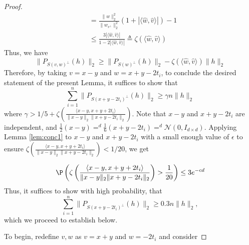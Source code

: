 \begin{proof}
\begin{align*}
& = \frac{\|w\|_2^2}{\|w_{v^\perp}\|_2^2}\left(1 + |\langle \hat{w}, \hat{v} \rangle | \right) - 1\\
& \leq \frac{3 |\langle \hat{w}, \hat{v} \rangle |}{1- 2|\langle \hat{w}, \hat{v} \rangle |} \triangleq \zeta( \langle\hat{w},\hat{v} \rangle )
\end{align*}
Thus, we have
\[
\| P_{S(v,w)^\perp}(h) \|_2 \geq \|P_{S(w)^\perp}(h)\|_2 -  \zeta( \langle \hat{w},\hat{v} \rangle) \|h\|_2
\]
Therefore, by taking $v = x-y$ and $w = x+y -2t_i$, to conclude the desired statement of the present Lemma, it suffices to show that
\[
\sum_{i=1}^n \| P_{S(x+y-2t_i)^\perp}(h)\|_2 \geq \gamma n\|h\|_2
\]
where $\gamma > 1/5 + \zeta \left(\frac{\langle x-y, x+y + 2t_i \rangle}{\|x-y\|_2 \| x+y -2t_i \|_2}\right)$. Note that $x-y$ and $x+y - 2t_i$ are independent, and $\frac{1}{2}(x-y) =^d \frac{1}{6}(x+y-2t_i) =^d \mathcal{N}(0,I_{d\times d})$. Applying Lemma \ref{lem:conc1} to $x-y$ and $x+y-2t_i$ with a small enough value of $\epsilon$ to ensure $\zeta\left(\frac{\langle x-y, x+y + 2t_i \rangle}{\|x-y\|_2 \| x+y -2t_i \|_2}\right) < 1/20$, we get

\[
\P\left( \zeta\left(\frac{\langle x-y, x+y + 2t_i \rangle}{\|x-y\|_2 \| x+y -2t_i \|_2}\right) > \frac{1}{20} \right) \leq 3e^{-c d}
\]
Thus, it suffices to show with high probability, that
\[
\sum_{i=1}^n \| P_{S(x+y-2t_i)^\perp}(h)\|_2 \geq 0.3 n\|h\|_2,
\]
which we proceed to establish below. 

To begin, redefine $v,w$ as $v = x+y$ and $w = -2t_i$ and consider


\end{proof}
